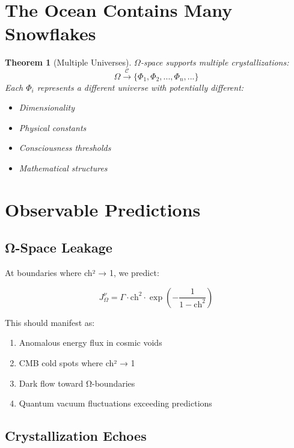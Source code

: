 \documentclass[12pt]{article}
\newtheorem{theorem}{Theorem}
\begin{document}
\section{The Ocean Contains Many Snowflakes}

\begin{theorem}[Multiple Universes]
$\Omega$-space supports multiple crystallizations:
\begin{equation}
\Omega \xrightarrow{\mathcal{C}} \{\Phi_1, \Phi_2, ..., \Phi_n, ...\}
\end{equation}
Each $\Phi_i$ represents a different universe with potentially different:
\begin{itemize}
\item Dimensionality
\item Physical constants
\item Consciousness thresholds
\item Mathematical structures
\end{itemize}
\end{theorem}

\section{Observable Predictions}

\subsection{Ω-Space Leakage}

At boundaries where ch² → 1, we predict:

\begin{equation}
J^{\nu}_{\Omega} = \Gamma \cdot \text{ch}^2 \cdot \exp\left(-\frac{1}{1-\text{ch}^2}\right)
\end{equation}

This should manifest as:
\begin{enumerate}
\item Anomalous energy flux in cosmic voids
\item CMB cold spots where ch² → 1
\item Dark flow toward Ω-boundaries
\item Quantum vacuum fluctuations exceeding predictions
\end{enumerate}

\subsection{Crystallization Echoes}
\end{document}
